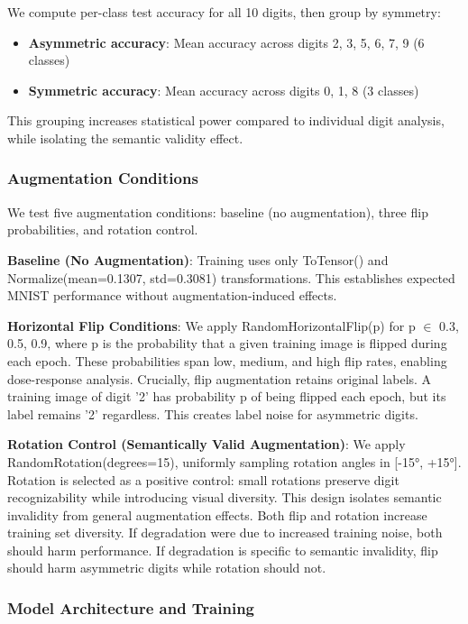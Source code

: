 We compute per-class test accuracy for all 10 digits, then group by symmetry:
\begin{itemize}
\item \textbf{Asymmetric accuracy}: Mean accuracy across digits {2, 3, 5, 6, 7, 9} (6 classes)
\item \textbf{Symmetric accuracy}: Mean accuracy across digits {0, 1, 8} (3 classes)
\end{itemize}

This grouping increases statistical power compared to individual digit analysis, while isolating the semantic validity effect.

\subsubsection{Augmentation Conditions}

We test five augmentation conditions: baseline (no augmentation), three flip probabilities, and rotation control.

\textbf{Baseline (No Augmentation)}: Training uses only ToTensor() and Normalize(mean=0.1307, std=0.3081) transformations. This establishes expected MNIST performance without augmentation-induced effects.

\textbf{Horizontal Flip Conditions}: We apply RandomHorizontalFlip(p) for p $\in$ {0.3, 0.5, 0.9}, where p is the probability that a given training image is flipped during each epoch. These probabilities span low, medium, and high flip rates, enabling dose-response analysis. Crucially, flip augmentation retains original labels. A training image of digit '2' has probability p of being flipped each epoch, but its label remains '2' regardless. This creates label noise for asymmetric digits.

\textbf{Rotation Control (Semantically Valid Augmentation)}: We apply RandomRotation(degrees=15), uniformly sampling rotation angles in [-15°, +15°]. Rotation is selected as a positive control: small rotations preserve digit recognizability while introducing visual diversity. This design isolates semantic invalidity from general augmentation effects. Both flip and rotation increase training set diversity. If degradation were due to increased training noise, both should harm performance. If degradation is specific to semantic invalidity, flip should harm asymmetric digits while rotation should not.

\subsubsection{Model Architecture and Training}

